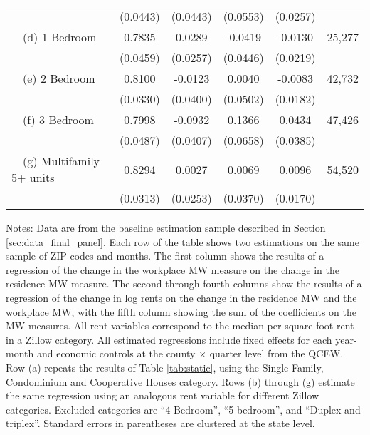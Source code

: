 \begin{landscape}
\begin{table}[ht!]
\begin{tabular}{@{}lccccc@{}}
                                                 & (0.0443) & (0.0443) & (0.0553) & (0.0257) &      \\
        $\quad$(d) 1 Bedroom                     &  0.7835  &  0.0289  &  -0.0419  &  -0.0130  & 25,277 \\
                                                 & (0.0459) & (0.0257) & (0.0446) & (0.0219) &      \\
        $\quad$(e) 2 Bedroom                     &  0.8100  &  -0.0123  &  0.0040  &  -0.0083  & 42,732 \\
                                                 & (0.0330) & (0.0400) & (0.0502) & (0.0182) &      \\
        $\quad$(f) 3 Bedroom                     &  0.7998  &  -0.0932  &  0.1366  &  0.0434  & 47,426 \\
                                                 & (0.0487) & (0.0407) & (0.0658) & (0.0385) &      \\
        $\quad$(g) Multifamily 5+ units          &  0.8294  &  0.0027  &  0.0069  &  0.0096  & 54,520 \\
                                                 & (0.0313) & (0.0253) & (0.0370) & (0.0170) &      \\ \bottomrule
    \end{tabular}

    \begin{minipage}{.95\linewidth} \footnotesize
        \vspace{2mm}
        Notes:
        Data are from the baseline estimation sample described in Section 
        \ref{sec:data_final_panel}.
        Each row of the table shows two estimations on the same sample of ZIP 
        codes and months.
        The first column shows the results of a regression of the change in the 
        workplace MW measure on the change in the residence MW measure.
        The second through fourth columns show the results of a regression of 
        the change in log rents on the change in the residence MW and the 
        workplace MW, with the fifth column showing the sum of the coefficients 
        on the MW measures.
        All rent variables correspond to the median per square foot rent in a 
        Zillow category.
        All estimated regressions include fixed effects for each year-month and 
        economic controls at the county $\times$ quarter level from the QCEW.
        Row (a) repeats the results of Table \ref{tab:static}, using the 
        Single Family, Condominium and Cooperative Houses category.
        Rows (b) through (g) estimate the same regression using an analogous 
        rent variable for different Zillow categories.
        Excluded categories are ``4 Bedroom'', ``5 bedroom'', and 
        ``Duplex and triplex''.
        Standard errors in parentheses are clustered at the state level.
    \end{minipage}
\end{table}
\end{landscape}
